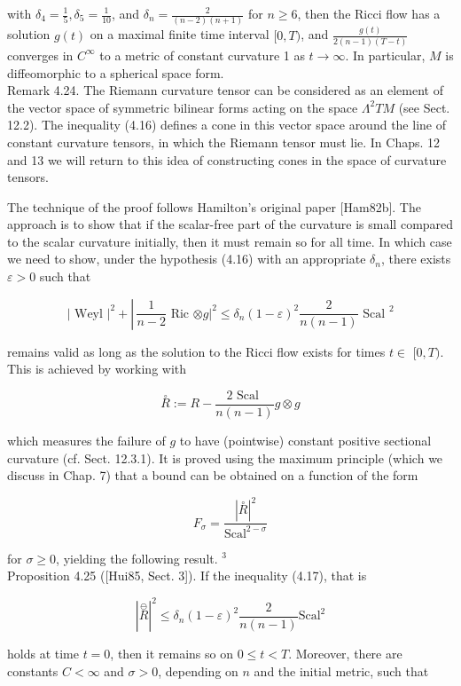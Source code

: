 \documentclass[10pt, letterpaper]{article}
\begin{document}
with $\delta_{4}=\frac{1}{5}, \delta_{5}=\frac{1}{10}$, and $\delta_{n}=\frac{2}{(n-2)(n+1)}$ for $n \geq 6$, then the Ricci flow has a solution $g(t)$ on a maximal finite time interval $[0, T)$, and $\frac{g(t)}{2(n-1)(T-t)}$ converges in $C^{\infty}$ to a metric of constant curvature 1 as $t \rightarrow \infty$. In particular, $M$ is diffeomorphic to a spherical space form.\\
Remark 4.24. The Riemann curvature tensor can be considered as an element of the vector space of symmetric bilinear forms acting on the space $\Lambda^{2} T M$ (see Sect. 12.2). The inequality (4.16) defines a cone in this vector space around the line of constant curvature tensors, in which the Riemann tensor must lie. In Chaps. 12 and 13 we will return to this idea of constructing cones in the space of curvature tensors.

The technique of the proof follows Hamilton's original paper [Ham82b]. The approach is to show that if the scalar-free part of the curvature is small compared to the scalar curvature initially, then it must remain so for all time. In which case we need to show, under the hypothesis (4.16) with an appropriate $\delta_{n}$, there exists $\varepsilon>0$ such that

$$
\mid \text { Weyl }\left.\right|^{2}+\left\lvert\, \frac{1}{n-2}\right. \text { Ric }\left.\otimes g\right|^{2} \leq \delta_{n}(1-\varepsilon)^{2} \frac{2}{n(n-1)} \text { Scal }^{2}
$$

remains valid as long as the solution to the Ricci flow exists for times $t \in$ $[0, T)$. This is achieved by working with

$$
\stackrel{\circ}{R}:=R-\frac{2 \text { Scal }}{n(n-1)} g \otimes g
$$

which measures the failure of $g$ to have (pointwise) constant positive sectional curvature (cf. Sect. 12.3.1). It is proved using the maximum principle (which we discuss in Chap. 7) that a bound can be obtained on a function of the form

$$
F_{\sigma}=\frac{|\stackrel{\circ}{R}|^{2}}{\mathrm{Scal}^{2-\sigma}}
$$

for $\sigma \geq 0$, yielding the following result. ${ }^{3}$\\[0pt]
Proposition 4.25 ([Hui85, Sect. 3]). If the inequality (4.17), that is

$$
|\stackrel{\ominus}{R}|^{2} \leq \delta_{n}(1-\varepsilon)^{2} \frac{2}{n(n-1)} \mathrm{Scal}^{2}
$$

holds at time $t=0$, then it remains so on $0 \leq t<T$. Moreover, there are constants $C<\infty$ and $\sigma>0$, depending on $n$ and the initial metric, such that
\end{document}
